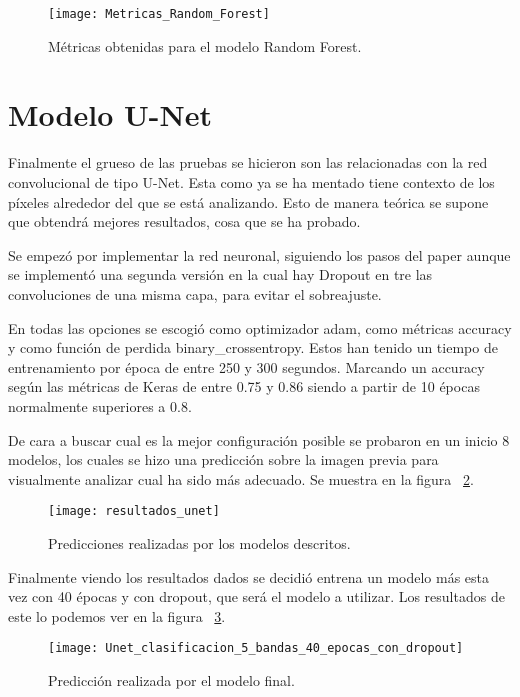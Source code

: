 \begin{figure}[H]
	\centering
	\texttt{[image: Metricas\_Random\_Forest]}
	\caption[Métricas obtenidas para el modelo Random Forest]{Métricas obtenidas para el modelo Random Forest.}
	\label{fig:metricas_rf}
\end{figure}

\section{Modelo U-Net}
Finalmente el grueso de las pruebas se hicieron son las relacionadas con la red convolucional de tipo U-Net. Esta como ya se ha mentado tiene contexto de los píxeles alrededor del que se está analizando. Esto de manera teórica se supone que obtendrá mejores resultados, cosa que se ha probado.

Se empezó por implementar la red neuronal, siguiendo los pasos del paper \cite{Unet} aunque se implementó una segunda versión en la cual hay Dropout en tre las convoluciones de una misma capa, para evitar el sobreajuste.

En todas las opciones se escogió como optimizador adam, como métricas accuracy y como función de perdida binary\_crossentropy. Estos han tenido un tiempo de entrenamiento por época de entre 250 y 300 segundos. Marcando un accuracy según las métricas de Keras de entre 0.75 y 0.86 siendo a partir de 10 épocas normalmente superiores a 0.8.

De cara a buscar cual es la mejor configuración posible se probaron en un inicio 8 modelos, los cuales se hizo una predicción sobre la imagen previa para visualmente analizar cual ha sido más adecuado. Se muestra en la figura ~\ref{fig:predicciones}.

\begin{figure}
	\centering
	\texttt{[image: resultados\_unet]}
	\caption[Predicciones realizadas por los modelos descritos]{Predicciones realizadas por los modelos descritos.}
	\label{fig:predicciones}
\end{figure}

Finalmente viendo los resultados dados se decidió entrena un modelo más esta vez con 40 épocas y con dropout, que será el modelo a utilizar.
Los resultados de este lo podemos ver en la figura ~\ref{fig:prediccion_540c}.
	
\begin{figure}[H]
	\centering
	\texttt{[image: Unet\_clasificacion\_5\_bandas\_40\_epocas\_con\_dropout]}
	\caption[Predicción realizada por el modelo final]{Predicción realizada por el modelo final.}
	\label{fig:prediccion_540c}
\end{figure}

